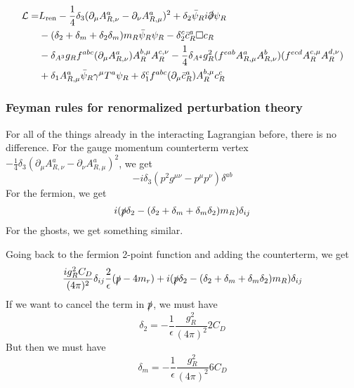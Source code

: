 \documentclass[a4paper]{book}
\theoremstyle{definition}
\theoremstyle{remark}
\begin{document}
\begin{equation}
    \begin{aligned}
        \mathcal L =& L_{\text{ren}} -\frac{1}{4}\delta_3 (\partial_\mu A^a_{R,\nu} - \partial_\nu A^a_{R, \mu})^2  + \delta_2 \bar \psi_R i\slashed{\partial} \psi_R \\ 
        &- (\delta_2 + \delta_m +\delta_2\delta_m)m_R \bar \psi_R\psi_R - \delta_2^c \bar{c}_R^a \square c_R \\ 
        &- \delta_{A^3} g_R f^{abc}(\partial_\mu A^a_{R,\nu}) A^{b,\mu}_R A^{c,\nu}_R -\frac{1}{4}\delta_{A^4} g^2_R (f^{eab}A^a_{R,\mu} A^b_{R,\nu})(f^{ecd} A^{c,\mu}_R A^{d,\nu}_R) \\ 
        &+ \delta_1 A^a_{R,\mu} \bar \psi_R \gamma^\mu T^a \psi_R + \delta_1^c f^{abc}(\partial_\mu \bar c^a_R) A^{b,\mu}_R c^c_R
    \end{aligned}
\end{equation}

\subsubsection{Feyman rules for renormalized perturbation theory}
For all of the things already in the interacting Lagrangian before, there is no difference. For the gauge momentum counterterm vertex $-\frac{1}{4}\delta_3 (\partial_\mu A^a_{R,\nu} - \partial_\nu A^a_{R, \mu})^2$, we get 
\begin{equation}
    -i \delta_3 (p^2 g^{\mu\nu} - p^\mu p^\nu) \delta^{ab}
\end{equation}
For the fermion, we get 
\begin{equation}
    i(\slashed{p} \delta_2 - (\delta_2 + \delta_m + \delta_m\delta_2)m_R)\delta_{ij}
\end{equation}
For the ghosts, we get something similar. \par \medskip 

Going back to the fermion 2-point function and adding the counterterm, we get 
\begin{equation}
    \frac{ig_R^2 C_D}{(4\pi)^2}\delta_{ij} \frac{2}{\epsilon}(\slashed{p} - 4m_r) + i(\slashed{p} \delta_2 - (\delta_2 + \delta_m + \delta_m\delta_2)m_R)\delta_{ij}
\end{equation}
If we want to cancel the term in $\slashed{p}$, we must have  
\begin{equation}
    \delta_2 = -\frac{1}{\epsilon} \frac{g_R^2 }{(4\pi)^2} 2C_D
\end{equation}
But then we must have 
\begin{equation}
    \delta_m = -\frac{1}{\epsilon} \frac{g_R^2 }{(4\pi)^2} 6C_D
\end{equation}
\end{document}
